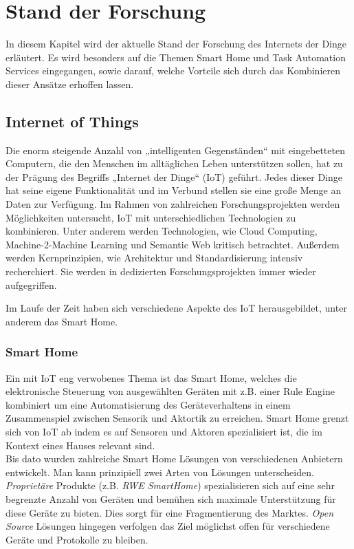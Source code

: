 \chapter{Stand der Forschung}
In diesem Kapitel wird der aktuelle Stand der Forschung des Internets der Dinge erläutert. Es wird besonders auf die Themen Smart Home und Task Automation Services eingegangen, sowie darauf, welche Vorteile sich durch das Kombinieren dieser Ansätze erhoffen lassen.


\section{Internet of Things}
Die enorm steigende Anzahl von „intelligenten Gegenständen“ mit eingebetteten Computern, die den Menschen im alltäglichen Leben unterstützen sollen, hat zu der Prägung des Begriffs „Internet der Dinge“ (IoT) geführt. Jedes dieser Dinge hat seine eigene Funktionalität und im Verbund stellen sie eine große Menge an Daten zur Verfügung. Im Rahmen von zahlreichen Forschungsprojekten \cite{ierc:portfolios} werden Möglichkeiten untersucht, IoT mit unterschiedlichen Technologien zu kombinieren. Unter anderem werden Technologien, wie Cloud Computing, Machine-2-Machine Learning und Semantic Web kritisch betrachtet. Außerdem werden Kernprinzipien, wie Architektur und Standardisierung intensiv recherchiert. Sie werden in dedizierten Forschungsprojekten \cite{icore:achitecture}\cite{iota:d25} immer wieder aufgegriffen.

Im Laufe der Zeit haben sich verschiedene Aspekte des IoT herausgebildet, unter anderem das Smart Home.

\subsection{Smart Home}
Ein mit IoT eng verwobenes Thema ist das Smart Home\cite{SmartHomeIoT}, welches die elektronische Steuerung von ausgewählten Geräten mit z.B. einer Rule Engine kombiniert um eine Automatisierung des Geräteverhaltens in einem Zusammenspiel zwischen Sensorik und Aktortik zu erreichen. Smart Home grenzt sich von IoT ab indem es auf Sensoren und Aktoren spezialisiert ist, die im Kontext eines Hauses relevant sind.\\

Bis dato wurden zahlreiche Smart Home Lösungen von verschiedenen Anbietern entwickelt. Man kann prinzipiell zwei Arten von Lösungen unterscheiden. \textit{Proprietäre} Produkte (z.B. \textit{RWE SmartHome}\cite{RWE}) spezialisieren sich auf eine sehr begrenzte Anzahl von Geräten und bemühen sich maximale Unterstützung für diese Geräte zu bieten. Dies sorgt für eine Fragmentierung des Marktes. \textit{Open Source} Lösungen hingegen verfolgen das Ziel möglichst offen für verschiedene Geräte und Protokolle zu bleiben.\\ 

